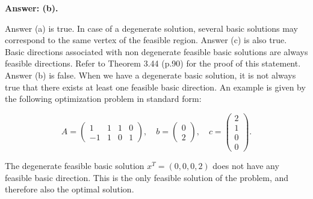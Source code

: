 {\bf Answer: (b).}

Answer (a) is true. In case of a degenerate solution, several basic solutions may correspond to the same vertex of the feasible region.
Answer (c) is also true. Basic directions associated with non degenerate feasible basic solutions are always feasible directions. Refer to Theorem 3.44 (p.90) for the proof of this statement. Answer (b) is false. When we have a degenerate basic solution, it is not always true that there exists at least one feasible basic direction.
An example is given by the following optimization problem in standard form:

$$ A=
\begin{pmatrix}
1 & 1 & 1 & 0\\
-1 & 1 & 0 & 1
\end{pmatrix}, \quad
b=
\begin{pmatrix}
0\\
2
\end{pmatrix}, \quad
c=
\begin{pmatrix}
2\\
1\\
0\\
0
\end{pmatrix}.$$

The degenerate feasible basic solution $x^T = (0, 0, 0, 2)$ does not have any feasible basic direction. This is the only feasible solution of the problem, and therefore also the optimal solution.

